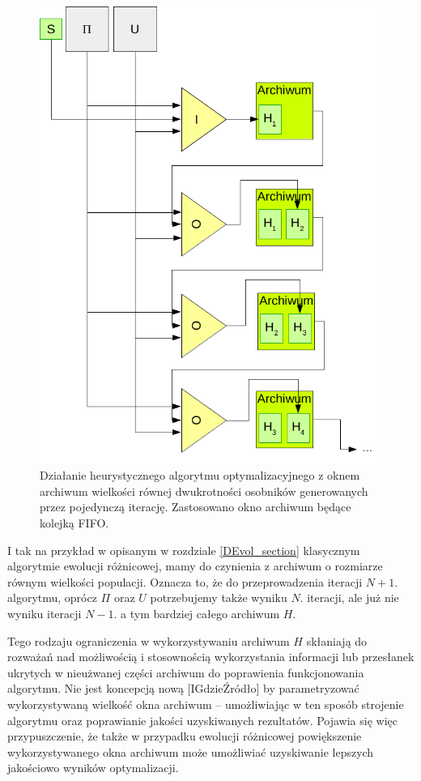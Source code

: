 \documentclass[11pt,a4paper]{report}
\begin{document}
{{\begin{figure}[htb]
\begin{center}\includegraphics[scale=0.5]{img/ModelArchiwumFIFO2}\end{center}
\caption{Działanie heurystycznego algorytmu optymalizacyjnego z oknem archiwum wielkości równej dwukrotności osobników generowanych przez pojedynczą iterację. Zastosowano okno archiwum będące kolejką FIFO.}
\label{ModelArchiwumImg}
\end{figure}
\par{
I tak na przykład w opisanym w rozdziale \ref{DEvol_section} klasycznym algorytmie ewolucji różnicowej, mamy do czynienia z archiwum o rozmiarze równym wielkości populacji. Oznacza to, że do przeprowadzenia iteracji $N+1.$ algorytmu, oprócz $\Pi$ oraz $U$ potrzebujemy także wyniku $N.$ iteracji, ale już nie wyniku iteracji $N-1$. a tym bardziej całego archiwum $H$.
}
\par{
Tego rodzaju ograniczenia w wykorzystywaniu archiwum $H$ skłaniają do rozważań nad możliwością i stosownością wykorzystania informacji lub przesłanek ukrytych w nieużwanej części archiwum do poprawienia funkcjonowania algorytmu. Nie jest koncepcją nową [IGdzieŹródło] by parametryzować wykorzystywaną wielkość okna archiwum -- umożliwiając w ten sposób strojenie algorytmu oraz poprawianie jakości uzyskiwanych rezultatów. Pojawia się więc przypuszczenie, że także w przypadku ewolucji różnicowej powiększenie wykorzystywanego okna archiwum może umożliwiać uzyskiwanie lepszych jakościowo wyników optymalizacji.
}

}}
\end{document}
